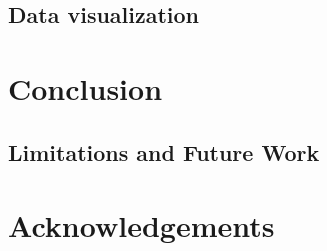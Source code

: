 \documentclass[11pt, a4paper,oneside,chapterprefix=false]{scrbook}
\begin{document}
\newpage
\section{Data visualization} \label{sec:result_data_visualization}
\chapter{Conclusion} \label{chp:conclusion}



\section{Limitations and Future Work}

\chapter*{Acknowledgements}





\listoffigures
\listoftables
\end{document}
